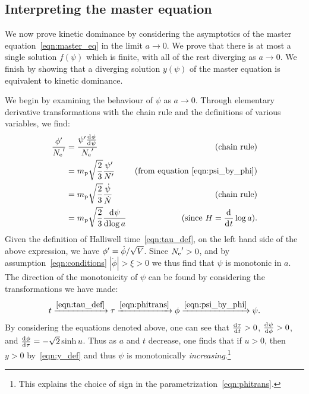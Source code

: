\subsection{Interpreting the master equation}
\label{sec:interpreting_the_master_equation}

We now prove kinetic dominance by considering the asymptotics of the master equation~\eqref{eqn:master_eq} in the limit \(a\rightarrow0\). We prove that there is at most a single solution \(f(\psi)\) which is finite, with all of the rest diverging as \(a\rightarrow0\). We finish by showing that a diverging solution \(y(\psi)\) of the master equation is equivalent to kinetic dominance.

We begin by examining the behaviour of \(\psi\) as \(a\rightarrow0\). Through elementary derivative transformations with the chain rule and the definitions of various variables, we find:
%
\begin{align}
  \frac{{{\phi}^\prime}}{{{N_\mathrm{e}}^\prime}} 
  &=
  \frac{{{\psi}^\prime}\frac{\operatorname{d}^{}\!{\phi}}{\operatorname{d}^{}\!{\psi}}}{{{N_\mathrm{e}}^\prime}}
  &\text{(chain rule)} 
  \nonumber
  \\
  &=
  m_{\mathrm{p}}\sqrt{\frac{2}{3}}\frac{{{\psi}^\prime}}{{{N}^\prime}}  
  &\text{(from equation \protect\ref{eqn:psi_by_phi})} 
  \nonumber
  \\
  &=
  m_{\mathrm{p}}\sqrt{\frac{2}{3}}\frac{\dot\psi}{\dot{N}}  
  &\text{(chain rule)} 
  \nonumber
  \\
  &=
  m_{\mathrm{p}}\sqrt{\frac{2}{3}}\frac{\operatorname{d}^{}\!{\psi}}{\operatorname{d}^{}\!{\log a}}
  &\text{(since \(H=\frac{\operatorname{d}^{}\!{}}{\operatorname{d}^{}\!{t}}\log a\))}.
  \label{eqn:div_psi}
\end{align}
%
Given the definition of Halliwell time~\eqref{eqn:tau_def}, on the left hand side of the above expression, we have \({{\phi}^\prime} = \dot\phi/\sqrt{V}\). Since \({{N_\mathrm{e}}^\prime}>0\), and by assumption~\eqref{eqn:conditions} \({|\dot\phi|>\xi>0}\) we thus find that \(\psi\) is monotonic in \(a\).
The direction of the monotonicity of \(\psi\) can be found by considering the transformations we have made: %
\begin{equation}
  t
  \xrightarrow{\protect\eqref{eqn:tau_def}}
  \tau
  \xrightarrow{\protect\eqref{eqn:phitrans}}
  \phi
  \xrightarrow{\protect\eqref{eqn:psi_by_phi}}
  \psi.
\end{equation}
%
By considering the equations denoted above, one can see that \(\frac{\operatorname{d}^{}\!{\tau}}{\operatorname{d}^{}\!{t}}>0\), \(\frac{\operatorname{d}^{}\!{\psi}}{\operatorname{d}^{}\!{\phi}}>0\), and \(\frac{\operatorname{d}^{}\!{\phi}}{\operatorname{d}^{}\!{\tau}} = -\sqrt{2}\sinh u\). Thus as \(a\) and \(t\) decrease, one finds that if \(u>0\), then \(y>0\) by~\eqref{eqn:y_def} and thus \(\psi\) is monotonically {\em increasing}.\footnote{This explains the choice of sign in the parametrization~\protect\eqref{eqn:phitrans}.}
